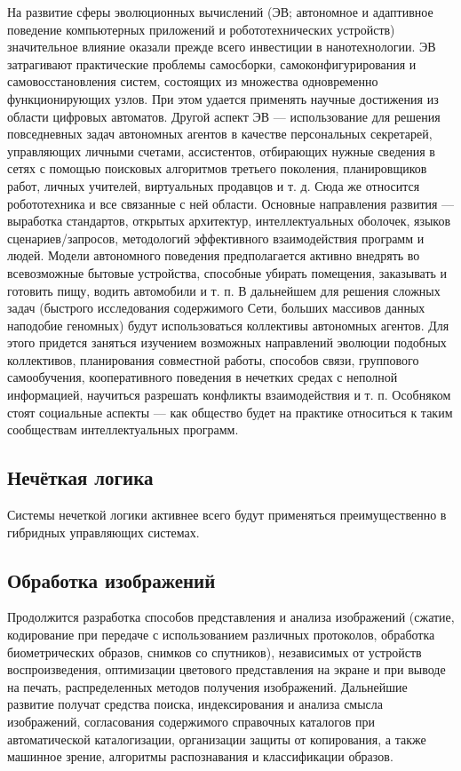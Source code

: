 На развитие сферы эволюционных вычислений (ЭВ; автономное и адаптивное поведение компьютерных приложений и робототехнических устройств) значительное влияние оказали прежде всего инвестиции в нанотехнологии. ЭВ затрагивают практические проблемы самосборки, самоконфигурирования и самовосстановления систем, состоящих из множества одновременно функционирующих узлов. При этом удается применять научные достижения из области цифровых автоматов. Другой аспект ЭВ --- использование для решения повседневных задач автономных агентов в качестве персональных секретарей, управляющих личными счетами, ассистентов, отбирающих нужные сведения в сетях с помощью поисковых алгоритмов третьего поколения, планировщиков работ, личных учителей, виртуальных продавцов и т. д. Сюда же относится робототехника и все связанные с ней области. Основные направления развития --- выработка стандартов, открытых архитектур, интеллектуальных оболочек, языков сценариев/запросов, методологий эффективного взаимодействия программ и людей. Модели автономного поведения предполагается активно внедрять во всевозможные бытовые устройства, способные убирать помещения, заказывать и готовить пищу, водить автомобили и т. п. В дальнейшем для решения сложных задач (быстрого исследования содержимого Сети, больших массивов данных наподобие геномных) будут использоваться коллективы автономных агентов. Для этого придется заняться изучением возможных направлений эволюции подобных коллективов, планирования совместной работы, способов связи, группового самообучения, кооперативного поведения в нечетких средах с неполной информацией, научиться разрешать конфликты взаимодействия и т. п. Особняком стоят социальные аспекты --- как общество будет на практике относиться к таким сообществам интеллектуальных программ.

\subsection{Нечёткая логика}

Системы нечеткой логики активнее всего будут применяться преимущественно в гибридных управляющих системах.

\subsection{Обработка изображений}

Продолжится разработка способов представления и анализа изображений (сжатие, кодирование при передаче с использованием различных протоколов, обработка биометрических образов, снимков со спутников), независимых от устройств воспроизведения, оптимизации цветового представления на экране и при выводе на печать, распределенных методов получения изображений. Дальнейшие развитие получат средства поиска, индексирования и анализа смысла изображений, согласования содержимого справочных каталогов при автоматической каталогизации, организации защиты от копирования, а также машинное зрение, алгоритмы распознавания и классификации образов.

